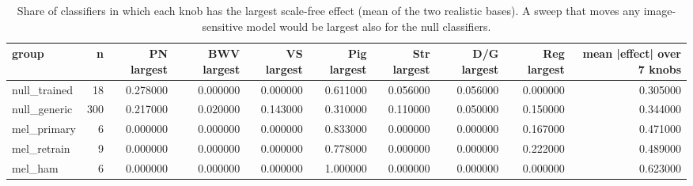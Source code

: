 \begin{table}
\caption{Share of classifiers in which each knob has the largest scale-free effect (mean of the two realistic bases). A sweep that moves any image-sensitive model would be largest also for the null classifiers.}
\label{tab:T6_profile}
\begin{tabular}{lrrrrrrrrr}
\toprule
group & n & PN largest & BWV largest & VS largest & Pig largest & Str largest & D/G largest & Reg largest & mean |effect| over 7 knobs \\
\midrule
null\_trained & 18 & 0.278000 & 0.000000 & 0.000000 & 0.611000 & 0.056000 & 0.056000 & 0.000000 & 0.305000 \\
null\_generic & 300 & 0.217000 & 0.020000 & 0.143000 & 0.310000 & 0.110000 & 0.050000 & 0.150000 & 0.344000 \\
mel\_primary & 6 & 0.000000 & 0.000000 & 0.000000 & 0.833000 & 0.000000 & 0.000000 & 0.167000 & 0.471000 \\
mel\_retrain & 9 & 0.000000 & 0.000000 & 0.000000 & 0.778000 & 0.000000 & 0.000000 & 0.222000 & 0.489000 \\
mel\_ham & 6 & 0.000000 & 0.000000 & 0.000000 & 1.000000 & 0.000000 & 0.000000 & 0.000000 & 0.623000 \\
\bottomrule
\end{tabular}
\end{table}
